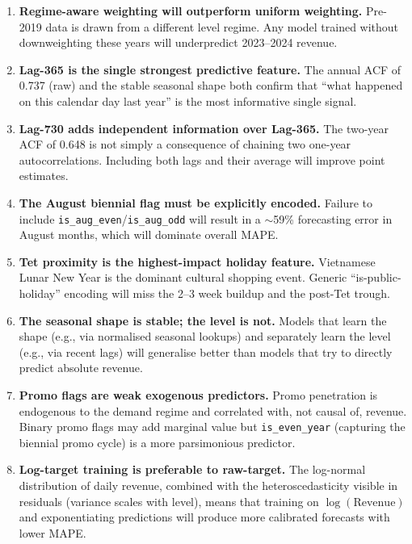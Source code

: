 \documentclass{article}
\begin{document}
\begin{enumerate}[leftmargin=1.5em, itemsep=6pt]

\item[\textbf{H1}] \textbf{Regime-aware weighting will outperform
  uniform weighting.}
  Pre-2019 data is drawn from a different level regime.
  Any model trained without downweighting these years will underpredict 2023--2024
  revenue.

\item[\textbf{H2}] \textbf{Lag-365 is the single strongest predictive feature.}
  The annual ACF of 0.737 (raw) and the stable seasonal shape both confirm that
  ``what happened on this calendar day last year'' is the most informative
  single signal.

\item[\textbf{H3}] \textbf{Lag-730 adds independent information over Lag-365.}
  The two-year ACF of 0.648 is not simply a consequence of chaining two
  one-year autocorrelations.
  Including both lags and their average will improve point estimates.

\item[\textbf{H4}] \textbf{The August biennial flag must be explicitly encoded.}
  Failure to include \texttt{is\_aug\_even}/\texttt{is\_aug\_odd} will result in
  a $\sim$59\% forecasting error in August months, which will dominate overall
  MAPE.

\item[\textbf{H5}] \textbf{Tet proximity is the highest-impact holiday feature.}
  Vietnamese Lunar New Year is the dominant cultural shopping event.
  Generic ``is-public-holiday'' encoding will miss the 2--3 week buildup and the
  post-Tet trough.

\item[\textbf{H6}] \textbf{The seasonal shape is stable; the level is not.}
  Models that learn the shape (e.g., via normalised seasonal lookups) and
  separately learn the level (e.g., via recent lags) will generalise better than
  models that try to directly predict absolute revenue.

\item[\textbf{H7}] \textbf{Promo flags are weak exogenous predictors.}
  Promo penetration is endogenous to the demand regime and correlated with, not
  causal of, revenue.
  Binary promo flags may add marginal value but \texttt{is\_even\_year}
  (capturing the biennial promo cycle) is a more parsimonious predictor.

\item[\textbf{H8}] \textbf{Log-target training is preferable to raw-target.}
  The log-normal distribution of daily revenue, combined with the
  heteroscedasticity visible in residuals (variance scales with level), means
  that training on $\log(\text{Revenue})$ and exponentiating predictions will
  produce more calibrated forecasts with lower MAPE.

\end{enumerate}
\end{document}
